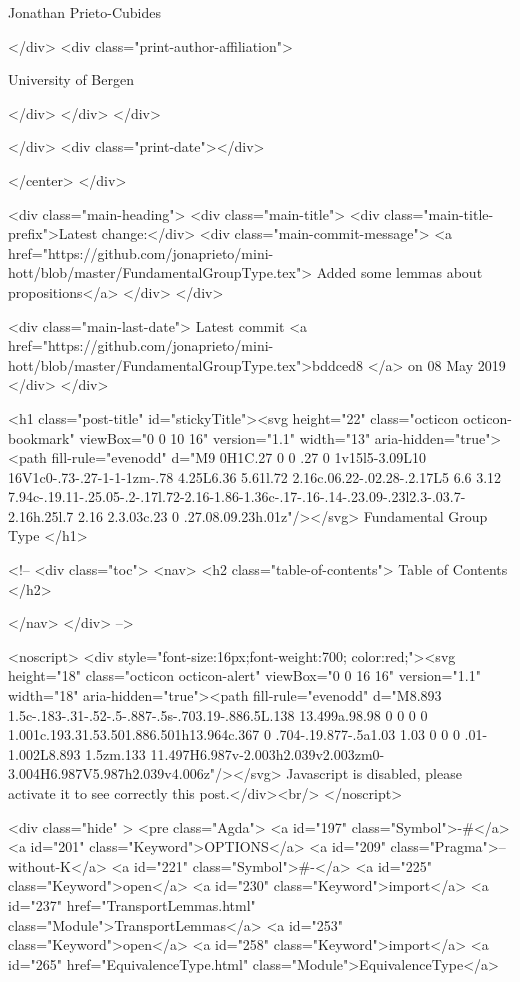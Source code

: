                   Jonathan Prieto-Cubides
                
              </div>
              <div class="print-author-affiliation">
                
                  University of Bergen
                
                </div>
            </div>
          </div>
          
          
        </div>
        <div class="print-date"></div>
        
        
    </center>
  </div>

  
  <div class="main-heading">
    <div class="main-title">
      <div class="main-title-prefix">Latest change:</div>
      <div class="main-commit-message">
            <a href="https://github.com/jonaprieto/mini-hott/blob/master/FundamentalGroupType.tex">
              Added some lemmas about propositions</a>
      </div>
    </div>

    <div class="main-last-date">
      Latest commit <a href="https://github.com/jonaprieto/mini-hott/blob/master/FundamentalGroupType.tex">bddced8 </a> on  08 May 2019
    </div>
  </div>
  
  <h1 class="post-title" id="stickyTitle"><svg height="22" class="octicon octicon-bookmark" viewBox="0 0 10 16" version="1.1" width="13" aria-hidden="true"><path fill-rule="evenodd" d="M9 0H1C.27 0 0 .27 0 1v15l5-3.09L10 16V1c0-.73-.27-1-1-1zm-.78 4.25L6.36 5.61l.72 2.16c.06.22-.02.28-.2.17L5 6.6 3.12 7.94c-.19.11-.25.05-.2-.17l.72-2.16-1.86-1.36c-.17-.16-.14-.23.09-.23l2.3-.03.7-2.16h.25l.7 2.16 2.3.03c.23 0 .27.08.09.23h.01z"/></svg> Fundamental Group Type
  </h1>

  <!-- 
  <div class="toc">
    <nav>
    <h2 class="table-of-contents"> Table of Contents </h2>
      

    </nav>
  </div>
   -->

  <noscript>
  <div style="font-size:16px;font-weight:700; color:red;"><svg height="18" class="octicon octicon-alert" viewBox="0 0 16 16" version="1.1" width="18" aria-hidden="true"><path fill-rule="evenodd" d="M8.893 1.5c-.183-.31-.52-.5-.887-.5s-.703.19-.886.5L.138 13.499a.98.98 0 0 0 0 1.001c.193.31.53.501.886.501h13.964c.367 0 .704-.19.877-.5a1.03 1.03 0 0 0 .01-1.002L8.893 1.5zm.133 11.497H6.987v-2.003h2.039v2.003zm0-3.004H6.987V5.987h2.039v4.006z"/></svg> Javascript is disabled, please activate it to see correctly this post.</div><br/>
  </noscript>

  <div class="hide" >
<pre class="Agda">
<a id="197" class="Symbol">{-#</a> <a id="201" class="Keyword">OPTIONS</a> <a id="209" class="Pragma">--without-K</a> <a id="221" class="Symbol">#-}</a>
<a id="225" class="Keyword">open</a> <a id="230" class="Keyword">import</a> <a id="237" href="TransportLemmas.html" class="Module">TransportLemmas</a>
<a id="253" class="Keyword">open</a> <a id="258" class="Keyword">import</a> <a id="265" href="EquivalenceType.html" class="Module">EquivalenceType</a>

